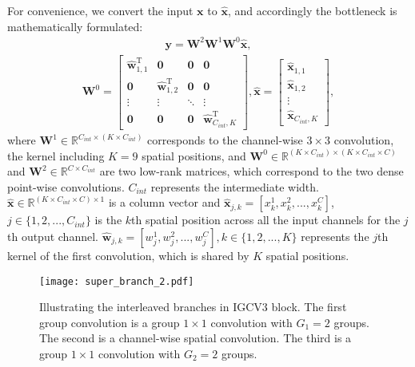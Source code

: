 \documentclass{bmvc2k}
\begin{document}
	For convenience, we convert the input $\mathbf{x}$ to $\mathbf{\hat{x}}$, and accordingly the bottleneck is mathematically formulated:
	\begin{align}
	\mathbf{y} = \mathbf{W}^2\mathbf{W}^1\mathbf{W}^0 \mathbf{\hat{x}},
	\label{eqn:mnv2}
	\end{align}
	\begin{align}
	\mathbf{W}^0 =  \begin{bmatrix}
	\mathbf{\hat{w}}_{1,1}^\mathrm{T} & \boldsymbol{0} &  \boldsymbol{0} &  \boldsymbol{0}
	\\[0.3em]
	\boldsymbol{0} & \mathbf{\hat{w}}_{1,2}^\mathrm{T}  & \boldsymbol{0} & \boldsymbol{0} \\[0.3em]
	\vdots & \vdots & \ddots  & \vdots \\[0.3em]
	\boldsymbol{0} & \boldsymbol{0} & \boldsymbol{0} & \mathbf{\hat{w}}_{C_{int},K}^\mathrm{T}
	\end{bmatrix},
	\mathbf{\hat{x}} =  \begin{bmatrix}
	\mathbf{\hat{x}}_{1,1}\\[0.3em]
	\mathbf{\hat{x}}_{1,2}  \\[0.3em]
	\vdots \\[0.3em]
	\mathbf{\hat{x}}_{C_{int},K}
	\end{bmatrix},
	\label{eqn:mmnv2}
	\end{align}
	where $\mathbf{W}^1 \in \mathbb{R}^{C_{int}\times (K\times C_{int})}$ corresponds to the channel-wise $3 \times 3$ convolution, the kernel including $K=9$ spatial positions, and $\mathbf{W}^0 \in \mathbb{R}^{(K\times C_{int})\times (K\times C_{int}\times C)}$ and $\mathbf{W}^2 \in \mathbb{R}^{C\times C_{int}}$ are two low-rank matrices, which correspond to the two dense point-wise convolutions. $C_{int}$ represents the intermediate width. $\mathbf{\hat{x}}\in \mathbb{R}^{(K\times C_{int} \times C)\times 1}$ is a column vector and $\mathbf{\hat{x}}_{j,k} = [x^1_k,x^2_k,...,x^{C}_k]$, $j \in \{1,2,...,C_{int}\}$ is the $k$th spatial position across all the input channels for the $j$th output channel. $\mathbf{\hat{w}}_{j,k}=[w_j^1,w_j^2,...,w_j^{C}], k\in\{1,2,...,K\}$ represents the $j$th kernel of the first convolution, which is shared by $K$ spatial positions.
	
	\begin{figure}[t]
		\centering
		\texttt{[image: super\_branch\_2.pdf]}
		\caption{Illustrating the interleaved branches in IGCV$3$ block. The first group convolution is a group $1\times1$ convolution with $G_1=2$ groups. The second is a channel-wise spatial convolution. The third is a group $1\times1$ convolution with $G_2=2$ groups.}
		\label{fig:igc-v3-path}
	\end{figure}
\end{document}
